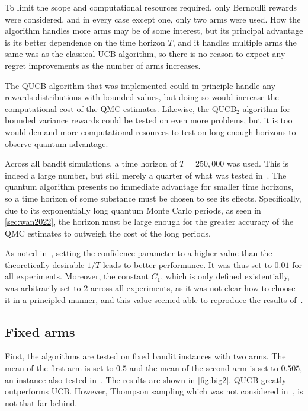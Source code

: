 
To limit the scope and computational resources required, only Bernoulli rewards were considered, and in every case except one, only two arms were used.
How the algorithm handles more arms may be of some interest, but its principal advantage is its better dependence on the time horizon $T$, and it handles multiple arms the same was as the classical UCB algorithm, so there is no reason to expect any regret improvements as the number of arms increases.

The QUCB algorithm that was implemented could in principle handle any rewards distributions with bounded values, but doing so would increase the computational cost of the QMC estimates.
Likewise, the QUCB$_2$ algorithm for bounded variance rewards could be tested on even more problems, but it is too would demand more computational resources to test on long enough horizons to observe quantum advantage.


Across all bandit simulations, a time horizon of $T=250,000$ was used.
This is indeed a large number, but still merely a quarter of what was tested in~\autocite{wan2022}.
The quantum algorithm presents no immediate advantage for smaller time horizons, so  a time horizon of some substance must be chosen to see its effects.
Specifically, due to its exponentially long quantum Monte Carlo periods, as seen in \cref{sec:wan2022}, the horizon must be large enough for the greater accuracy of the QMC estimates to outweigh the cost of the long periods.

As noted in~\autocite{wan2022}, setting the confidence parameter to a higher value than the theoretically desirable $1/T$ leads to better performance.
It was thus set to $0.01$ for all experiments.
Moreover, the constant $C_1$, which is only defined existentially, was arbitrarily set to $2$ across all experiments, as it was not clear how to choose it in a principled manner, and this value seemed able to reproduce the results of~\autocite{wan2022}.

\clearpage

\subsection{Fixed arms}
\label{sec:sim_fixed_arms}
First, the algorithms are tested on fixed bandit instances with two arms.
The mean of the first arm is set to $0.5$ and the mean of the second arm is set to $0.505$, an instance also tested in~\autocite{wan2022}.
The results are shown in \cref{fig:big2}.
QUCB greatly outperforms UCB.
However, Thompson sampling which was not considered in~\autocite{wan2022}, is not that far behind.

